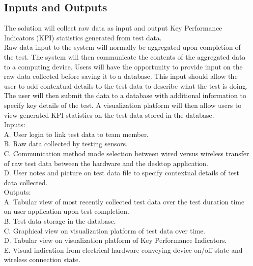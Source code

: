 \documentclass{article}
\begin{document}
\subsection{Inputs and Outputs}


The solution will collect raw data as input and output Key Performance Indicators (KPI) statistics generated from test data. \\

Raw data input to the system will normally be aggregated upon completion of the test. The system will then communicate the contents of the aggregated data to a computing device. Users will have the opportunity to provide input on the raw data collected before saving it to a database. This input should allow the user to add contextual details to the test data to describe what the test is doing. The user will then submit the data to a database with additional information to specify key details of the test. A visualization platform will then allow users to view generated KPI statistics on the test data stored in the database. \\

Inputs: \\
A. User login to link test data to team member. \\
B. Raw data collected by testing sensors. \\
C. Communication method mode selection between wired versus wireless transfer of raw test data between the hardware and the desktop application. \\
D. User notes and picture on test data file to specify contextual details of test data collected. \\

Outputs: \\
A. Tabular view of most recently collected test data over the test duration time on user application upon test completion. \\
B. Test data storage in the database. \\
C. Graphical view on visualization platform of test data over time. \\
D. Tabular view on visualization platform of Key Performance Indicators. \\
E. Visual indication from electrical hardware conveying device on/off state and wireless connection state. \newpage
\end{document}
